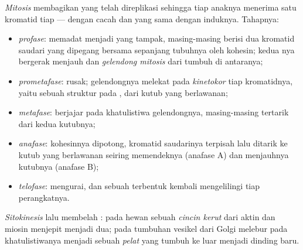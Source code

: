 \begin{definition}[Mitosis]\label{def:b1:replication-mitosis:mitosis}
\emph{Mitosis} membagikan  yang telah direplikasi sehingga tiap
 anaknya menerima satu kromatid tiap  --- dengan cacah
dan  yang sama dengan induknya. Tahapnya:
\begin{itemize}
  \item \emph{profase}:  memadat menjadi  yang tampak,
        masing-masing berisi dua kromatid saudari yang dipegang bersama
        sepanjang tubuhnya oleh  kohesin; kedua
        \emph{}nya bergerak menjauh dan \emph{gelendong
        mitosis} dari  tumbuh di antaranya;
  \item \emph{prometafase}:  rusak; 
        gelendongnya melekat pada \emph{kinetokor} tiap kromatidnya,
        yaitu sebuah struktur  pada , dari kutub yang
        berlawanan;
  \item \emph{metafase}:  berjajar pada khatulistiwa
        gelendongnya, masing-masing tertarik dari kedua kutubnya;
  \item \emph{anafase}: kohesinnya dipotong, kromatid saudarinya
        terpisah lalu ditarik ke kutub yang berlawanan seiring
        memendeknya  (anafase A) dan menjauhnya kutubnya
        (anafase B);
  \item \emph{telofase}:  mengurai, dan sebuah 
        terbentuk kembali mengelilingi tiap perangkatnya.
\end{itemize}
\emph{Sitokinesis} lalu membelah : pada  hewan sebuah
\emph{cincin kerut} dari aktin dan miosin menjepit  menjadi dua;
pada  tumbuhan vesikel dari Golgi melebur pada khatulistiwanya
menjadi sebuah \emph{pelat } yang tumbuh ke luar menjadi dinding baru.
\end{definition}

